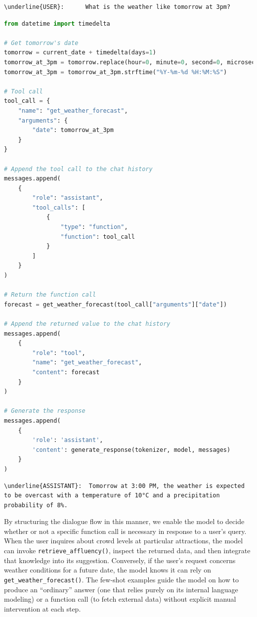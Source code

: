 \begin{enumerate}
\begin{Verbatim}[breaklines=true]
\underline{USER}:      What is the weather like tomorrow at 3pm?
\end{Verbatim}
\begin{center}
\begin{lstlisting}[language=Python, frame=single, caption=Few-shot on \texttt{get\_weather\_forecast()}., label=lst:few-shot-weather]
from datetime import timedelta

# Get tomorrow's date
tomorrow = current_date + timedelta(days=1)
tomorrow_at_3pm = tomorrow.replace(hour=0, minute=0, second=0, microsecond=0)
tomorrow_at_3pm = tomorrow_at_3pm.strftime("%Y-%m-%d %H:%M:%S")

# Tool call
tool_call = {
    "name": "get_weather_forecast",
    "arguments": {
        "date": tomorrow_at_3pm
    }
}

# Append the tool call to the chat history
messages.append(
    {
        "role": "assistant",
        "tool_calls": [
            {
                "type": "function",
                "function": tool_call
            }
        ]
    }
)

# Return the function call
forecast = get_weather_forecast(tool_call["arguments"]["date"])

# Append the returned value to the chat history
messages.append(
    {
        "role": "tool",
        "name": "get_weather_forecast",
        "content": forecast
    }
)

# Generate the response
messages.append(
    {
        'role': 'assistant',
        'content': generate_response(tokenizer, model, messages)
    }
)
\end{lstlisting}
\end{center}
\begin{Verbatim}[breaklines=true]
\underline{ASSISTANT}:  Tomorrow at 3:00 PM, the weather is expected to be overcast with a temperature of 10°C and a precipitation probability of 8%.
\end{Verbatim}
\end{enumerate}

By structuring the dialogue flow in this manner, we enable the model to decide whether or not a specific function call is necessary in response to a user’s query. When the user inquires about crowd levels at particular attractions, the model can invoke \texttt{retrieve\_affluency()}, inspect the returned data, and then integrate that knowledge into its suggestion. Conversely, if the user’s request concerns weather conditions for a future date, the model knows it can rely on \texttt{get\_weather\_forecast()}. The few-shot examples guide the model on how to produce an “ordinary” answer (one that relies purely on its internal language modeling) or a function call (to fetch external data) without explicit manual intervention at each step. 

